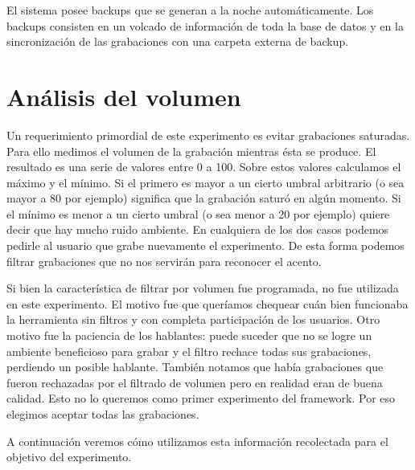 El sistema posee backups que se generan a la noche automáticamente. Los backups consisten en un volcado de información de toda la base de datos y en la sincronización de las grabaciones con una carpeta externa de backup.

\section{Análisis del volumen}

Un requerimiento primordial de este experimento es evitar grabaciones saturadas. Para ello medimos el volumen de la grabación mientras ésta se produce. El resultado es una serie de valores entre 0 a 100. Sobre estos valores calculamos el máximo y el mínimo. Si el primero es mayor a un cierto umbral arbitrario (o sea mayor a 80 por ejemplo) significa que la grabación saturó en algún momento. Si el mínimo es menor a un cierto umbral (o sea menor a 20 por ejemplo) quiere decir que hay mucho ruido ambiente. En cualquiera de los dos casos podemos pedirle al usuario que grabe nuevamente el experimento. De esta forma podemos filtrar grabaciones que no nos servirán para reconocer el acento.

Si bien la característica de filtrar por volumen fue programada, no fue utilizada en este experimento. El motivo fue que queríamos chequear cuán bien funcionaba la herramienta sin filtros y con completa participación de los usuarios. Otro motivo fue la paciencia de los hablantes: puede suceder que no se logre un ambiente beneficioso para grabar y el filtro rechace todas sus grabaciones, perdiendo un posible hablante. También notamos que había grabaciones que fueron rechazadas por el filtrado de volumen pero en realidad eran de buena calidad. Esto no lo queremos como primer experimento del framework. Por eso elegimos aceptar todas las grabaciones.

A continuación veremos cómo utilizamos esta información recolectada para el objetivo del experimento.